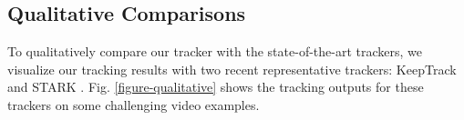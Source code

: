 \documentclass[runningheads]{llncs}
\begin{document}
\subsection{Qualitative Comparisons}
To qualitatively compare our tracker with the state-of-the-art trackers, we visualize our tracking results with two recent representative trackers: KeepTrack \cite{mayer2021learning} and STARK \cite{yan2021learning}. Fig. \ref{figure-qualitative} shows the tracking outputs for these trackers on some challenging video examples.
\end{document}
